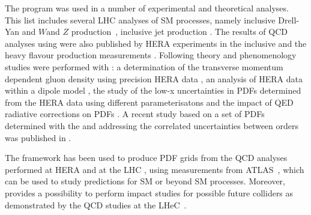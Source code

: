 The \fitter program was used in a number of experimental and theoretical analyses. 
This list includes several LHC analyses of SM processes, namely
inclusive Drell-Yan and $W$and $Z$ production~\cite{atlas:strange,atlas:hm,cms:strange},
inclusive jet production \cite{atlas:jets}.
The results of QCD analyses using \fitter were also
published by HERA experiments in the inclusive \cite{h1:2012kk} and
the heavy flavour production measurements \cite{h1zeus:charm, Abramowicz:2014zub}.
Following theory and phenomenology studies were performed with \fitter:
a determination of the transverse momentum dependent gluon density using precision HERA data \cite{Jung2014}, 
an analysis of HERA data within a dipole model \cite{Luszczak:2013rxa},
the study of the low-x uncertainties in PDFs determined from the HERA data using 
different parameterisatons \cite{Chebyshev} and the impact of QED radiative corrections on PDFs \cite{Sadykov:2014aua}.
A recent study based on a set of PDFs determined with the \fitter and addressing 
the correlated uncertainties between orders was published in \cite{hfcorrpaper}. 
%

The \fitter framework has been used to produce PDF grids from the QCD analyses performed at 
HERA \cite{h1zeus:2009wt,hera:grids} and at the LHC \cite{atlas:grids}, using 
measurements from ATLAS~\cite{atlas:strange,atlas:jets}, which can be used to study predictions for SM 
or beyond SM processes.  Moreover, \fitter provides a possibility to 
perform impact studies for possible future colliders
as demonstrated by the QCD studies at the LHeC~\cite{lhec:studies}.








